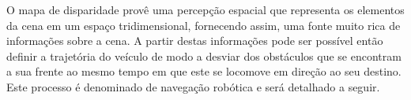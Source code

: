 

O mapa de disparidade provê uma percepção espacial que representa os elementos
da cena em um espaço tridimensional, fornecendo assim, uma fonte muito rica de
informações sobre a cena. A partir destas informações pode ser possível então
definir a trajetória do veículo de modo a desviar dos obstáculos que se
encontram a sua frente ao mesmo tempo em que este se locomove em direção ao seu
destino. Este processo é denominado de navegação robótica e será detalhado a
seguir.


